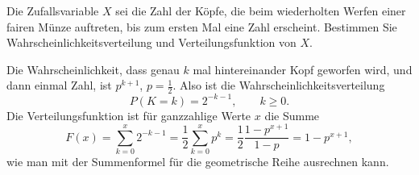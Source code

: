 Die Zufallsvariable $X$ sei die Zahl der Köpfe, die beim
wiederholten Werfen einer fairen Münze auftreten, bis zum
ersten Mal eine Zahl erscheint. Bestimmen Sie Wahrscheinlichkeitsverteilung
und Verteilungsfunktion von $X$.

\begin{loesung}
Die Wahrscheinlichkeit, dass genau $k$ mal hintereinander Kopf geworfen
wird, und dann einmal Zahl, ist $p^{k+1}$, $p=\frac12$. Also ist die
Wahrscheinlichkeitsverteilung
\[
P(K=k)=2^{-k-1},\qquad k\ge 0.
\]
Die Verteilungsfunktion ist für ganzzahlige Werte $x$ die Summe
\[
F(x)=\sum_{k=0}^x2^{-k-1}=\frac12\sum_{k=0}^x p^k=\frac12 \frac{1-p^{x+1}}{1-p}
=1-p^{x+1},
\]
wie man mit der Summenformel für die geometrische Reihe ausrechnen kann.
\end{loesung}

